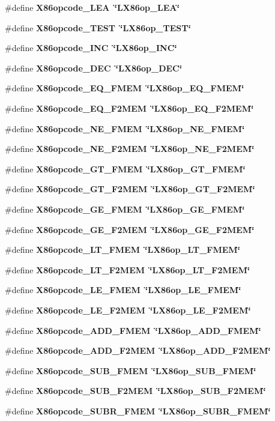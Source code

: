 \begin{CompactItemize}
\#define \bf{X86opcode\_\-LEA}~\char`\"{}LX86op\_\-LEA\char`\"{}
\item 
\#define \bf{X86opcode\_\-TEST}~\char`\"{}LX86op\_\-TEST\char`\"{}
\item 
\#define \bf{X86opcode\_\-INC}~\char`\"{}LX86op\_\-INC\char`\"{}
\item 
\#define \bf{X86opcode\_\-DEC}~\char`\"{}LX86op\_\-DEC\char`\"{}
\item 
\#define \bf{X86opcode\_\-EQ\_\-FMEM}~\char`\"{}LX86op\_\-EQ\_\-FMEM\char`\"{}
\item 
\#define \bf{X86opcode\_\-EQ\_\-F2MEM}~\char`\"{}LX86op\_\-EQ\_\-F2MEM\char`\"{}
\item 
\#define \bf{X86opcode\_\-NE\_\-FMEM}~\char`\"{}LX86op\_\-NE\_\-FMEM\char`\"{}
\item 
\#define \bf{X86opcode\_\-NE\_\-F2MEM}~\char`\"{}LX86op\_\-NE\_\-F2MEM\char`\"{}
\item 
\#define \bf{X86opcode\_\-GT\_\-FMEM}~\char`\"{}LX86op\_\-GT\_\-FMEM\char`\"{}
\item 
\#define \bf{X86opcode\_\-GT\_\-F2MEM}~\char`\"{}LX86op\_\-GT\_\-F2MEM\char`\"{}
\item 
\#define \bf{X86opcode\_\-GE\_\-FMEM}~\char`\"{}LX86op\_\-GE\_\-FMEM\char`\"{}
\item 
\#define \bf{X86opcode\_\-GE\_\-F2MEM}~\char`\"{}LX86op\_\-GE\_\-F2MEM\char`\"{}
\item 
\#define \bf{X86opcode\_\-LT\_\-FMEM}~\char`\"{}LX86op\_\-LT\_\-FMEM\char`\"{}
\item 
\#define \bf{X86opcode\_\-LT\_\-F2MEM}~\char`\"{}LX86op\_\-LT\_\-F2MEM\char`\"{}
\item 
\#define \bf{X86opcode\_\-LE\_\-FMEM}~\char`\"{}LX86op\_\-LE\_\-FMEM\char`\"{}
\item 
\#define \bf{X86opcode\_\-LE\_\-F2MEM}~\char`\"{}LX86op\_\-LE\_\-F2MEM\char`\"{}
\item 
\#define \bf{X86opcode\_\-ADD\_\-FMEM}~\char`\"{}LX86op\_\-ADD\_\-FMEM\char`\"{}
\item 
\#define \bf{X86opcode\_\-ADD\_\-F2MEM}~\char`\"{}LX86op\_\-ADD\_\-F2MEM\char`\"{}
\item 
\#define \bf{X86opcode\_\-SUB\_\-FMEM}~\char`\"{}LX86op\_\-SUB\_\-FMEM\char`\"{}
\item 
\#define \bf{X86opcode\_\-SUB\_\-F2MEM}~\char`\"{}LX86op\_\-SUB\_\-F2MEM\char`\"{}
\item 
\#define \bf{X86opcode\_\-SUBR\_\-FMEM}~\char`\"{}LX86op\_\-SUBR\_\-FMEM\char`\"{}
\item 

\end{CompactItemize}
